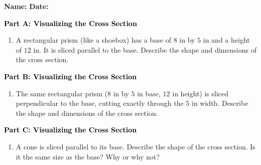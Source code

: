 \documentclass[12pt, letterpaper, fleqn]{article}
\begin{document}
\textbf{Name:} \underline{\hspace{5cm}}
\hfill
\textbf{Date:} \underline{\hspace{3cm}}\\

\begin{tcolorbox}[colback=customteal!20]
\large\textcolor{black}{\textbf{Part A: Visualizing the Cross Section}}
\end{tcolorbox}

\vspace{3mm}

\begin{enumerate}[itemsep=2.5cm, leftmargin=0.6cm]
\item A rectangular prism (like a shoebox) has a base of $8\text{ in}$ by $5\text{ in}$ and a height of $12\text{ in}$. It is sliced parallel to the base. Describe the shape and dimensions of the cross section.
\end{enumerate}

\newpage

\begin{tcolorbox}[colback=customteal!20]
\large\textcolor{black}{\textbf{Part B: Visualizing the Cross Section}}
\end{tcolorbox}

\vspace{3mm}

\begin{enumerate}[itemsep=2.5cm, leftmargin=0.6cm, resume]
\item The same rectangular prism ($8\text{ in}$ by $5\text{ in}$ base, $12\text{ in}$ height) is sliced perpendicular to the base, cutting exactly through the $5\text{ in}$ width. Describe the shape and dimensions of the cross section.
\end{enumerate}

\newpage

\begin{tcolorbox}[colback=customteal!20]
\large\textcolor{black}{\textbf{Part C: Visualizing the Cross Section}}
\end{tcolorbox}

\vspace{3mm}

\begin{enumerate}[itemsep=2.5cm, leftmargin=0.6cm, resume]
\item A cone is sliced parallel to its base. Describe the shape of the cross section. Is it the same size as the base? Why or why not?
\end{enumerate}
\end{document}
